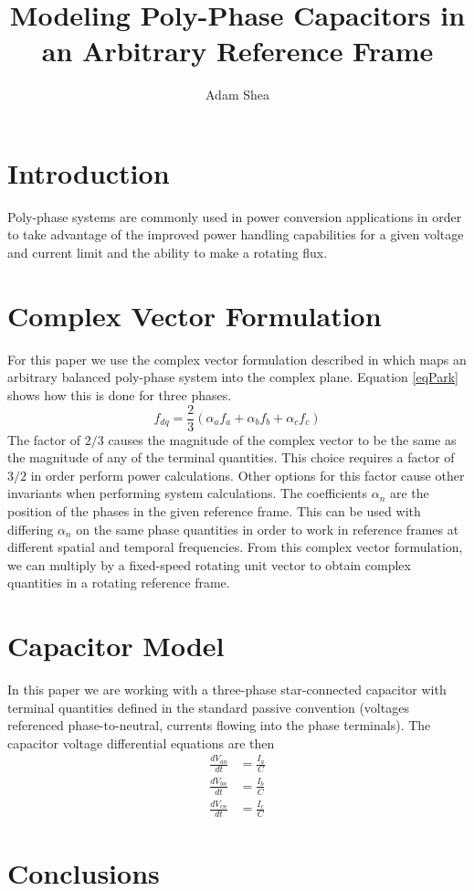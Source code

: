 \documentclass[10pt,letterpaper]{IEEEtran}
\begin{document}
\title{Modeling Poly-Phase Capacitors in an Arbitrary Reference Frame}
\author{Adam Shea}

\maketitle

\begin{abstract}
\end{abstract}

\section{Introduction}
Poly-phase systems are commonly used in power conversion applications in order
to take advantage of the improved power handling capabilities for a given
voltage and current limit and the ability to make a rotating flux.


\section{Complex Vector Formulation}
For this paper we use the complex vector formulation described in
\cite{Novotny} which maps an arbitrary balanced poly-phase system into the
complex plane.
Equation \ref{eqPark} shows how this is done for three phases.
\begin{equation}
\label{eqPark}
f_{dq} = \frac{2}{3} \left({\alpha_a f_a + \alpha_b f_b + \alpha_c f_c}\right)
\end{equation}
The factor of $2 / 3$ causes the magnitude of the complex vector to be the
same as the magnitude of any of the terminal quantities.
This choice requires a factor of $3 / 2$ in order perform power calculations.
Other options for this factor cause other invariants when performing system
calculations.
The coefficients $\alpha_n$ are the position of the phases in the given
reference frame.
This can be used with differing $\alpha_n$ on the same phase quantities in
order to work in reference frames at different spatial and temporal
frequencies. \cite{Rockhill}
From this complex vector formulation, we can multiply by a fixed-speed
rotating unit vector to obtain complex quantities in a rotating reference
frame.

\section{Capacitor Model}
In this paper we are working with a three-phase star-connected capacitor with
terminal quantities defined in the standard passive convention (voltages
referenced phase-to-neutral, currents flowing into the phase terminals). 
The capacitor voltage differential equations are then
\begin{align}
\frac{d V_{an}}{dt} &= \frac{I_a}{C} \\
\frac{d V_{bn}}{dt} &= \frac{I_b}{C} \\
\frac{d V_{cn}}{dt} &= \frac{I_c}{C}
\end{align}

\section{Conclusions}
\end{document}
